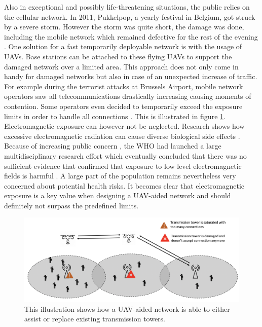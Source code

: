 Also in exceptional and possibly life-threatening situations, the public relies on the cellular network. 
In 2011, Pukkelpop, a yearly festival in Belgium, got struck by a severe storm. However the storm 
was quite short, the damage was done, including the mobile network which remained defective for the rest of the evening \cite{pukkelpop}.
One solution for a fast temporarily deployable network is with the usage of \gls{UAV}s. Base stations can be attached to 
these flying \gls{UAV}s to support the damaged network over a limited area. 
This approach does not only come in handy for 
damaged networks but also in case of an unexpected increase of traffic. 
For example during the terrorist attacks at Brussels Airport,
mobile network operators saw all telecommunications drastically increasing causing moments of contention. 
Some operators even decided to temporarily exceed the exposure limits in
order to handle all connections \cite{baseZaventem}.
This is illustrated in figure \ref{fig:networkIllustrationDamagedNetwork}.
Electromagnetic exposure can however not be neglected. Research shows how excessive electromagnetic radiation can cause diverse biological side effects \cite{J31_bioeffects}.
Because of increasing public concern \cite{J31_bioeffects}, the \gls{WHO} had launched a large multidisciplinary research effort which eventually concluded that there was no sufficient evidence that confirmed 
that exposure to low level electromagnetic fields is harmful \cite{WHO}. 
A large part of the population remains nevertheless very concerned about potential health risks.
It becomes clear that electromagnetic exposure is a key value when designing a \gls{UAV}-aided network and should definitely 
not surpass the predefined limits.

\begin{figure}[H]
\centering
  \includegraphics[width=\textwidth]{../images/networkIllustrationDamagedNetwork.png}
  \caption{This illustration shows how a UAV-aided network is able to either assist or replace 
  existing transmission towers.}
  \label{fig:networkIllustrationDamagedNetwork}
\end{figure}

